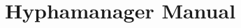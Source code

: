 \documentclass{article}
\begin{document}
\title{Hyphamanager Manual}

\maketitle

\begin{abstract}
\noindent

\end{abstract}

\setcounter{tocdepth}{2}
\tableofcontents

\newpage
\end{document}
